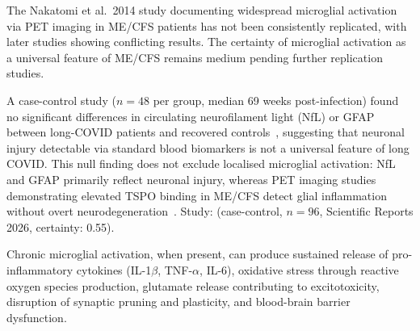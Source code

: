 \begin{warning}
The Nakatomi et al.\ 2014 study documenting widespread microglial activation via PET imaging in ME/CFS patients has not been consistently replicated, with later studies showing conflicting results. The certainty of microglial activation as a universal feature of ME/CFS remains medium pending further replication studies.
\end{warning}

\begin{observation}
\label{obs:omdal2026-null-nfl}
A case-control study ($n=48$ per group, median 69 weeks post-infection) found no
significant differences in circulating neurofilament light (NfL) or GFAP between
long-COVID patients and recovered controls~\cite{Omdal2026LongCovidNeuroinflammation},
suggesting that neuronal injury detectable via standard blood biomarkers is not a
universal feature of long COVID. This null finding does not exclude localised
microglial activation: NfL and GFAP primarily reflect neuronal injury, whereas
PET imaging studies demonstrating elevated TSPO binding in ME/CFS detect
glial inflammation without overt neurodegeneration~\cite{Nakatomi2014neuroinflammation}.
Study: (case-control, $n=96$, Scientific Reports 2026, certainty: 0.55).
\end{observation}

Chronic microglial activation, when present, can produce sustained release of pro-inflammatory cytokines (IL-1$\beta$, TNF-$\alpha$, IL-6), oxidative stress through reactive oxygen species production, glutamate release contributing to excitotoxicity, disruption of synaptic pruning and plasticity, and blood-brain barrier dysfunction.

